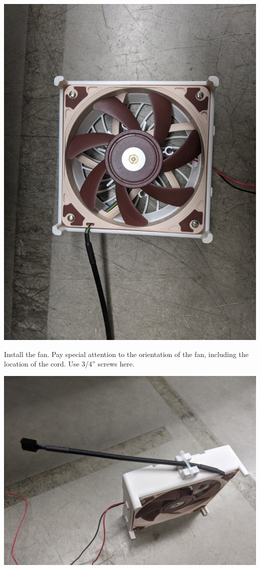 \documentclass[11pt]{article}
\begin{document}
\begin{center}
  \includegraphics[width=\textwidth/2]{"./mounted-fan.jpg"}
\end{center}

Install the fan.
Pay special attention to the orientation of the fan, including the location of the cord.
Use 3/4'' screws here.

\begin{center}
  \includegraphics[width=\textwidth/2]{"./cable-tie.jpg"}
\end{center}
\end{document}
